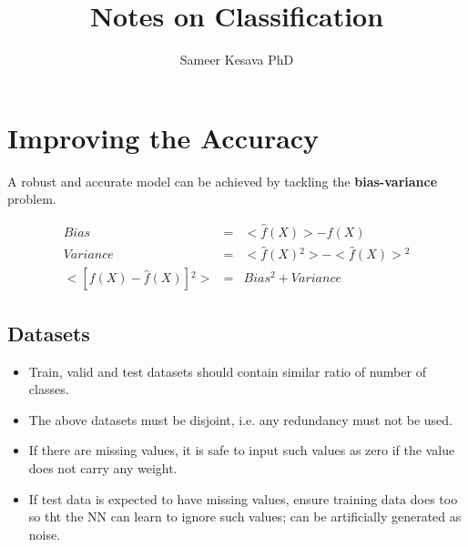 \documentclass[a4paper, 12pt]{report}
\begin{document}
\title{Notes on Classification}
\author{Sameer Kesava PhD}
\date{} %
\maketitle

\tableofcontents
\newpage



\chapter{Improving the Accuracy}
A robust and accurate model can be achieved by tackling the \textbf{bias-variance} problem.

\begin{eqnarray}
Bias & = & <\hat{f}(X)> - f(X)\\
Variance & = & <\hat{f}(X){^{2}}> - <\hat{f}(X)>{^{2}}\\
<[f(X) - \hat{f}(X)]{^{2}}> & = & Bias{^{2}} + Variance
\end{eqnarray}

\section{Datasets}
\label{sec:datasets}
\begin{itemize}
\item Train, valid and test datasets should contain similar ratio of number of classes.
\item The above datasets must be disjoint, i.e. any redundancy must not be used.
\item If there are missing values, it is safe to input such values as zero if the value does not carry any weight.
\item If test data is expected to have missing values, ensure training data does too so tht the NN can learn to ignore such values; can be artificially generated as noise.
\end{itemize}


\end{document}
